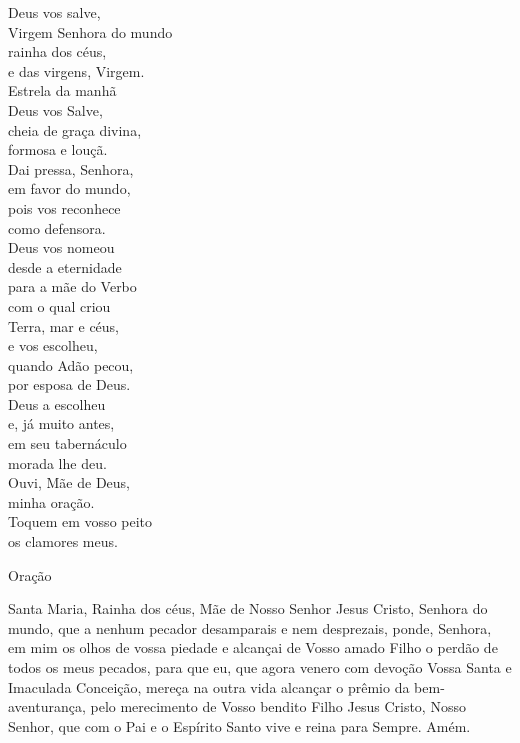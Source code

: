 \begin{multicols}{2}\setlength{\parindent}{0pt}
    Deus vos salve, \\
    Virgem Senhora do mundo \\
    rainha dos céus, \\
    e das virgens, Virgem.
    \vspace{.2cm} \\
    Estrela da manhã \\
    Deus vos Salve, \\
    cheia de graça divina, \\
    formosa e louçã.
    \vspace{.2cm} \\
    Dai pressa, Senhora, \\
    em favor do mundo, \\
    pois vos reconhece \\
    como defensora.
    \vspace{.2cm} \\
    Deus vos nomeou \\
    desde a eternidade \\
    para a mãe do Verbo \\
    com o qual criou
    \vspace{.2cm} \\
    Terra, mar e céus, \\
    e vos escolheu, \\
    quando Adão pecou, \\
    por esposa de Deus.
    \vspace{.2cm} \\
    Deus a escolheu \\
    e, já muito antes, \\
    em seu tabernáculo \\
    morada lhe deu.
    \vspace{.2cm} \\
    Ouvi, Mãe de Deus, \\
    minha oração. \\
    Toquem em vosso peito \\
    os clamores meus.
\end{multicols}
\newpage
\begin{center}
    \textcolor{VioletRed3}{Oração}
\end{center}
\begin{flushleft}
    Santa Maria, Rainha dos céus, Mãe de Nosso Senhor Jesus Cristo, Senhora do mundo, que a nenhum pecador desamparais e nem desprezais, ponde, Senhora, em mim os olhos de vossa piedade e alcançai de Vosso amado Filho o perdão de todos os meus pecados, para que eu, que agora venero com devoção Vossa Santa e Imaculada Conceição, mereça na outra vida alcançar o prêmio da bem-aventurança, pelo merecimento de Vosso bendito Filho Jesus Cristo, Nosso Senhor, que com o Pai e o Espírito Santo vive e reina para Sempre. Amém.
\end{flushleft}
